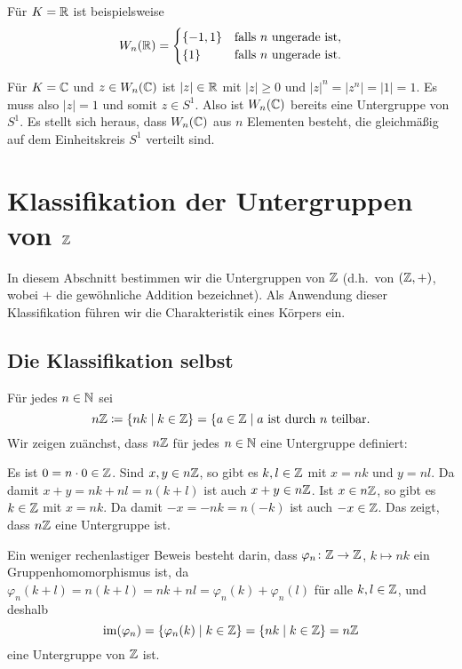 Für $K = \mathbb{R}$ ist beispielsweise
\[
 W_n(\mathbb{R})
 =
 \begin{cases}
  \{-1,1\} & \text{falls $n$ ungerade ist},\\
     \{1\} & \text{falls $n$ ungerade ist}.
 \end{cases}
\]

Für $K = \mathbb{C}$ und $z \in W_n(\mathbb{C})$ ist $|z| \in \mathbb{R}$ mit $|z| \geq 0$ und $|z|^n = |z^n| = |1| = 1$. Es muss also $|z| = 1$ und somit $z \in S^1$. Also ist $W_n(\mathbb{C})$ bereits eine Untergruppe von $S^1$. Es stellt sich heraus, dass $W_n(\mathbb{C})$ aus $n$ Elementen besteht, die gleichmäßig auf dem Einheitskreis $S^1$ verteilt sind.






\section{Klassifikation der Untergruppen von \texorpdfstring{$\mathbb{Z}$}{Z}}
In diesem Abschnitt bestimmen wir die Untergruppen von $\mathbb{Z}$ (d.h.\ von $(\mathbb{Z},+)$, wobei $+$ die gewöhnliche Addition bezeichnet). Als Anwendung dieser Klassifikation führen wir die Charakteristik eines Körpers ein.


\subsection{Die Klassifikation selbst}
Für jedes $n \in \mathbb{N}$ sei
\[
 n \mathbb{Z}
 \coloneqq \{n k \mid k \in \mathbb{Z}\}
 = \{a \in \mathbb{Z} \mid \text{$a$ ist durch $n$ teilbar}.
\]
Wir zeigen zuänchst, dass $n \mathbb{Z}$ für jedes $n \in \mathbb{N}$ eine Untergruppe definiert:

Es ist $0 = n \cdot 0 \in \mathbb{Z}$. Sind $x,y \in n\mathbb{Z}$, so gibt es $k,l \in \mathbb{Z}$ mit $x = nk$ und $y = nl$. Da damit $x+y = nk + nl = n(k+l)$ ist auch $x+y \in n\mathbb{Z}$. Ist $x \in n\mathbb{Z}$, so gibt es $k \in \mathbb{Z}$ mit $x = nk$. Da damit $-x = -nk = n(-k)$ ist auch $-x \in \mathbb{Z}$. Das zeigt, dass $n\mathbb{Z}$ eine Untergruppe ist.

\begin{bem}
 Ein weniger rechenlastiger Beweis besteht darin, dass $\varphi_n \colon \mathbb{Z} \to \mathbb{Z}$, $k \mapsto nk$ ein Gruppenhomomorphismus ist, da $\varphi_n(k+l) = n(k+l) = nk + nl = \varphi_n(k) + \varphi_n(l)$ für alle $k,l \in \mathbb{Z}$, und deshalb
 \[
  \mathrm{im}(\varphi_n) = \{\varphi_n(k) \mid k \in \mathbb{Z}\} = \{nk \mid k \in \mathbb{Z}\} = n\mathbb{Z}
 \]
 eine Untergruppe von $\mathbb{Z}$ ist.
\end{bem}

